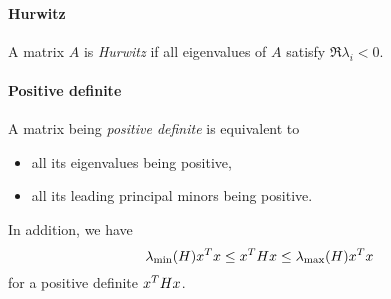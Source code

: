 \paragraph{Hurwitz}
A matrix $A$ is \emph{Hurwitz} if all eigenvalues of $A$ satisfy $\Re \lambda_i < 0$.

\paragraph{Positive definite} A matrix being \emph{positive definite} is equivalent to
\begin{itemize}
	\item all its eigenvalues being positive,
	\item all its leading principal minors being positive.
\end{itemize}
In addition, we have
\begin{equation}
	\lambda_{\mathrm{min}}(H) x^T x \leq x^T H x \leq \lambda_{\mathrm{max}}(H) x^T x
\end{equation}
for a positive definite $x^T H x$.
